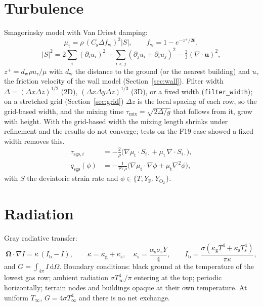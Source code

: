 \documentclass[11pt,a4paper]{article}
\newcommand{\vu}{\mathbf{u}}
\newcommand{\dd}{\,\mathrm{d}}
\newcommand{\code}[1]{\texttt{#1}}
\newcommand{\Yf}{Y_\text{F}}
\newcommand{\YO}{Y_{\mathrm{O_2}}}
\begin{document}
\section{Turbulence}\label{sec:turbulence}
Smagorinsky model with Van Driest damping:
\begin{equation}
  \mu_\text{t} = \rho\,(C_\text{s}\Delta f_\text{w})^2|S|,\qquad f_\text{w} = 1-e^{-z^+/26},
\end{equation}
\begin{equation}
  |S|^2 = 2\sum_i(\partial_iu_i)^2 + \sum_{i<j}(\partial_ju_i+\partial_iu_j)^2 - \tfrac23(\nabla\cdot\vu)^2,
\end{equation}
$z^+=d_\text{w}\rho u_\tau/\mu$ with $d_\text{w}$ the distance to the ground (or the nearest building) and $u_\tau$
the friction velocity of the wall model (Section~\ref{sec:wall}). Filter width
$\Delta=(\Delta x\Delta z)^{1/2}$ (2D), $(\Delta x\Delta y\Delta z)^{1/3}$ (3D), or a fixed width
(\code{filter\_width}); on a stretched grid (Section~\ref{sec:grid}) $\Delta z$ is the local spacing of
each row, so the grid-based width, and the mixing time $\tau_\text{mix}=\sqrt{2\Delta/g}$ that follows
from it, grow with height. With the grid-based width the mixing length shrinks under refinement and
the results do not converge; tests on the F19 case showed a fixed width removes this.
\begin{align}
  \tau_{\text{sgs},i} &= -\frac{2}{\rho}\big(\nabla\mu_\text{t}\cdot S_{i\cdot} + \mu_\text{t}\,\nabla\cdot S_{i\cdot}\big),\\
  q_\text{sgs}(\phi) &= -\frac{1}{\mathrm{Pr}\,\rho}\big(\nabla\mu_\text{t}\cdot\nabla\phi + \mu_\text{t}\nabla^2\phi\big),
\end{align}
with $S$ the deviatoric strain rate and $\phi\in\{T,\Yf,\YO\}$.

\section{Radiation}\label{sec:radiation}
Gray radiative transfer:
\begin{equation}
  \boldsymbol{\Omega}\cdot\nabla I = \kappa\,(I_\text{b}-I),\qquad \kappa=\kappa_\text{g}+\kappa_\text{s},\quad
  \kappa_\text{s}=\frac{\alpha_\text{s}\sigma_\text{s}Y}{4},\qquad
  I_\text{b} = \frac{\sigma(\kappa_\text{g}T^4+\kappa_\text{s}T_\text{s}^4)}{\pi\kappa},
\end{equation}
and $G=\int_{4\pi}I\dd\Omega$. Boundary conditions: black ground at the temperature of the lowest gas
row; ambient radiation $\sigma T_\infty^4/\pi$ entering at the top; periodic horizontally; terrain
nodes and buildings opaque at their own temperature. At uniform $T_\infty$, $G=4\sigma T_\infty^4$ and
there is no net exchange.
\end{document}
